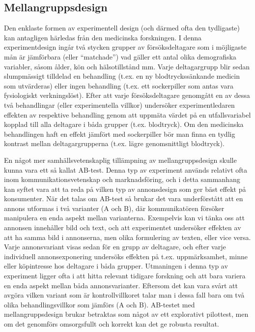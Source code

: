\documentclass[
]{book}
\begin{document}
\hypertarget{sub07.5.3}{%
\subsection{Mellangruppsdesign}\label{sub07.5.3}}

Den enklaste formen av experimentell design (och därmed ofta den tydligaste) kan antagligen härledas från den medicinska forskningen. I denna experimentdesign ingår två stycken grupper av försöksdeltagare som i möjligaste mån är jämförbara (eller ``matchade'') vad gäller ett antal olika demografiska variabler, såsom ålder, kön och hälsotillstånd mm. Varje deltagargrupp blir sedan slumpmässigt tilldelad en behandling (t.ex. en ny blodtryckssänkande medicin som utvärderas) eller ingen behandling (t.ex. ett sockerpiller som antas vara fysiologiskt verkningslöst). Efter att varje försöksdeltagare genomgått en av dessa två behandlingar (eller experimentella villkor) undersöker experimentledaren effekten av respektive behandling genom att uppmäta värdet på en utfallsvariabel kopplad till alla deltagare i båda grupper (t.ex. blodtryck). Om den medicinska behandlingen haft en effekt jämfört med sockerpiller bör man finna en tydlig kontrast mellan deltagargrupperna (t.ex. lägre genomsnittligt blodtryck).

En något mer samhällsvetenskaplig tillämpning av mellangruppsdesign skulle kunna vara ett så kallat AB-test. Denna typ av experiment används relativt ofta inom kommunikationsvetenskap och marknadsföring, och i detta sammanhang kan syftet vara att ta reda på vilken typ av annonsdesign som ger bäst effekt på konsumenter. När det talas om AB-test så brukar det vara underförstått att en annons utformas i två varianter (A och B), där kommunikatören försöker manipulera en enda aspekt mellan varianterna. Exempelvis kan vi tänka oss att annonsen innehåller bild och text, och att experimentet undersöker effekten av att ha samma bild i annonserna, men olika formulering av texten, eller vice versa. Varje annonsvariant visas sedan för en grupp av deltagare, och efter varje individuell annonsexponering undersöks effekten på t.ex. uppmärksamhet, minne eller köpintresse hos deltagare i båda grupper. Utmaningen i denna typ av experiment ligger ofta i att hitta relevant tidigare forskning och att bara variera en enda aspekt mellan båda annonsvarianter. Eftersom det kan vara svårt att avgöra vilken variant som är kontrollvillkoret talar man i dessa fall bara om två olika behandlingsvillkor som jämförs (A och B). AB-testet med mellangruppsdesign brukar betraktas som något av ett explorativt pilottest, men om det genomförs omsorgsfullt och korrekt kan det ge robusta resultat.
\end{document}

